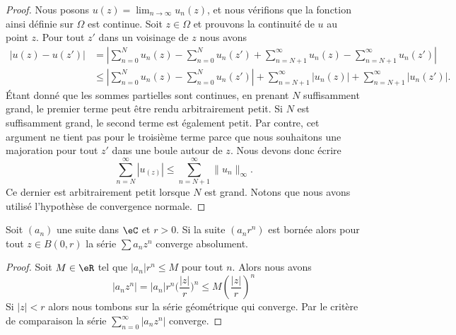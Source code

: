 \begin{proof}
    Nous posons \( u(z)=\lim_{n\to \infty} u_n(z)\), et nous vérifions que la fonction ainsi définie sur \( \Omega\) est continue. Soit \( z\in \Omega\) et prouvons la continuité de \( u\) au point \( z\). Pour tout \( z'\) dans un voisinage de \( z\) nous avons 
    \begin{subequations}
        \begin{align}
            \big| u(z)-u(z') \big|&=\left| \sum_{n=0}^{N}u_n(z)-\sum_{n=0}^{N}u_n(z')+\sum_{n=N+1}^{\infty}u_n(z)-\sum_{n=N+1}^{\infty}u_n(z') \right| \\
            &\leq \left| \sum_{n=0}^N u_n(z)-\sum_{n=0}^Nu_n(z') \right| +\sum_{n=N+1}^{\infty}| u_n(z) |+\sum_{n=N+1}^{\infty}| u_n(z') |.
        \end{align}
    \end{subequations}
    Étant donné que les sommes partielles sont continues, en prenant \( N\) suffisamment grand, le premier terme peut être rendu arbitrairement petit. Si \( N\) est suffisamment grand, le second terme est également petit. Par contre, cet argument ne tient pas pour le troisième terme parce que nous souhaitons une majoration pour tout \( z'\) dans une boule autour de \( z\). Nous devons donc écrire
    \begin{equation}
        \sum_{n=N}^{\infty}| u_(z) |\leq \sum_{n=N+1}^{\infty}\| u_n \|_{\infty}.
    \end{equation}
    Ce dernier est arbitrairement petit lorsque \( N\) est grand. Notons que nous avons utilisé l'hypothèse de convergence normale.
\end{proof}

\begin{lemma}
    Soit \( (a_n)\) une suite dans \( \eC\) et \( r>0\). Si la suite \( (a_nr^n)\) est bornée alors pour tout \( z\in B(0,r)\) la série \( \sum a_nz^n\) converge absolument.
\end{lemma}

\begin{proof}
    Soit \( M\in \eR\) tel que \( | a_n |r^n\leq M\) pour tout \( n\). Alors nous avons
    \begin{equation}
        | a_nz^n |=| a_n |r^n\big( \frac{ | z | }{ r } \big)^n\leq M\left( \frac{ | z | }{ r } \right)^n
    \end{equation}
    Si \( | z |<r\) alors nous tombons sur la série géométrique qui converge. Par le critère de comparaison la série \( \sum_{n=0}^{\infty}| a_nz^n |\) converge.
\end{proof}

